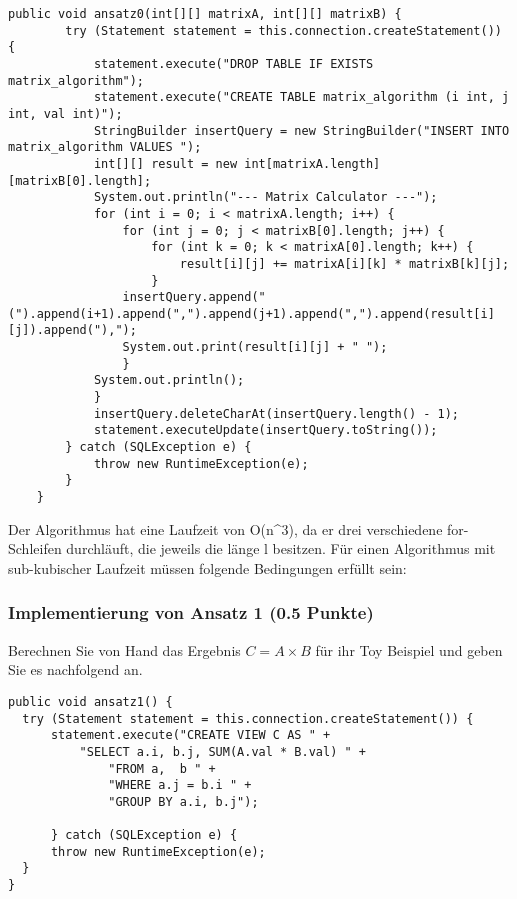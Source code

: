 \documentclass[11pt]{scrartcl}
\begin{document}
\begin{lstlisting}[style=dmrJava]
    public void ansatz0(int[][] matrixA, int[][] matrixB) {
        try (Statement statement = this.connection.createStatement()) {
            statement.execute("DROP TABLE IF EXISTS matrix_algorithm");
            statement.execute("CREATE TABLE matrix_algorithm (i int, j int, val int)");
            StringBuilder insertQuery = new StringBuilder("INSERT INTO matrix_algorithm VALUES ");
            int[][] result = new int[matrixA.length][matrixB[0].length];
            System.out.println("--- Matrix Calculator ---");
            for (int i = 0; i < matrixA.length; i++) {
                for (int j = 0; j < matrixB[0].length; j++) {
                    for (int k = 0; k < matrixA[0].length; k++) {
                        result[i][j] += matrixA[i][k] * matrixB[k][j];
                    }
                insertQuery.append("(").append(i+1).append(",").append(j+1).append(",").append(result[i][j]).append("),");
                System.out.print(result[i][j] + " ");
                }
            System.out.println();
            }
            insertQuery.deleteCharAt(insertQuery.length() - 1);
            statement.executeUpdate(insertQuery.toString());
        } catch (SQLException e) {
            throw new RuntimeException(e);
        }
    }
\end{lstlisting}

Der Algorithmus hat eine Laufzeit von O(n^3), da er drei verschiedene for-Schleifen durchläuft, die jeweils die länge l besitzen.
Für einen Algorithmus mit sub-kubischer Laufzeit müssen folgende Bedingungen erfüllt sein:


\subsubsection*{Implementierung von Ansatz 1 (0.5 Punkte)}
Berechnen Sie von Hand das Ergebnis $C = A \times B$ für ihr Toy Beispiel und geben Sie es nachfolgend an.

\begin{lstlisting}[style=dmrJava]
public void ansatz1() {
  try (Statement statement = this.connection.createStatement()) {
      statement.execute("CREATE VIEW C AS " +
          "SELECT a.i, b.j, SUM(A.val * B.val) " +
              "FROM a,  b " +
              "WHERE a.j = b.i " +
              "GROUP BY a.i, b.j");

      } catch (SQLException e) {
      throw new RuntimeException(e);
  }
}
\end{lstlisting}
\end{document}
